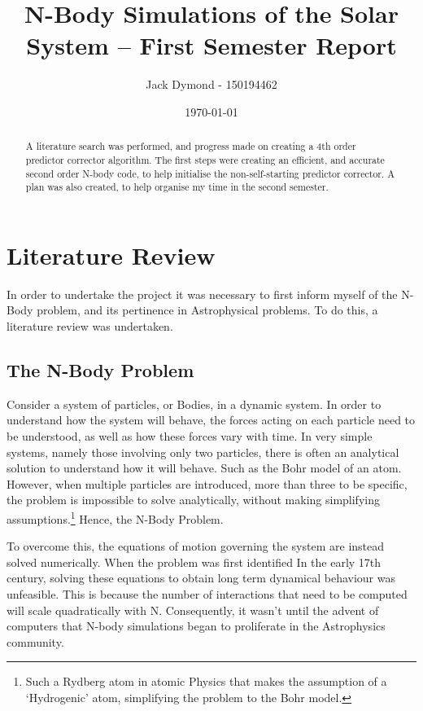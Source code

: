 \documentclass[a4paper,10pt]{article}
\title{N-Body Simulations of the Solar System -- First Semester Report}
\author{Jack Dymond - 150194462}
\date{\today}
\begin{document}
\maketitle

\begin{abstract}
A literature search was performed, and progress made on creating a 4th order predictor corrector algorithm. The first steps were creating an efficient, and accurate second order N-body code, to help initialise the non-self-starting predictor corrector. A plan was also created, to help organise my time in the second semester. 
\end{abstract}

\section{Literature Review}

In order to undertake the project it was necessary to first inform myself of the N-Body problem, and its pertinence in Astrophysical problems. To do this, a literature review was undertaken.

\subsection{The N-Body Problem}

Consider a system of particles, or Bodies, in a dynamic system. In order to understand how the system will behave, the forces acting on each particle need to be understood, as well as how these forces vary with time. In very simple systems, namely those involving only two particles, there is often an analytical solution to understand how it will behave. Such as the Bohr model of an atom. However, when multiple particles are introduced, more than three to be specific, the problem is impossible to solve analytically, without making simplifying assumptions.\footnote{Such a Rydberg atom in atomic Physics that makes the assumption of a `Hydrogenic' atom, simplifying the problem to the Bohr model.} Hence, the N-Body Problem.  

To overcome this, the equations of motion governing the system are instead solved numerically. When the problem was first identified In the early 17th century, solving these equations to obtain long term dynamical behaviour was unfeasible. This is because the number of interactions that need to be computed will scale quadratically with N. Consequently, it wasn't until the advent of computers that N-body simulations began to proliferate in the Astrophysics community.
\end{document}
